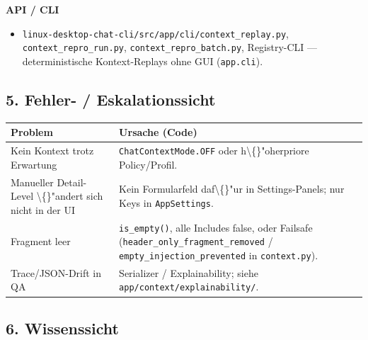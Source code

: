 \textbf{API / CLI}

\begin{itemize}
\item \texttt{linux-desktop-chat-cli/src/app/cli/context\_replay.py}, \texttt{context\_repro\_run.py}, \texttt{context\_repro\_batch.py}, Registry-CLI --- deterministische Kontext-Replays ohne GUI (\texttt{app.cli}).
\end{itemize}

\subsection{5. Fehler- / Eskalationssicht}

\begin{center}
\begin{tabular}{ll}
\hline
Problem & Ursache (Code) \\
\hline
Kein Kontext trotz Erwartung & \texttt{ChatContextMode.OFF} oder h\textbackslash\{\}"oherpriore Policy/Profil. \\
Manueller Detail-Level \textbackslash\{\}"andert sich nicht in der UI & Kein Formularfeld daf\textbackslash\{\}"ur in Settings-Panels; nur Keys in \texttt{AppSettings}. \\
Fragment leer & \texttt{is\_empty()}, alle Includes false, oder Failsafe (\texttt{header\_only\_fragment\_removed} / \texttt{empty\_injection\_prevented} in \texttt{context.py}). \\
Trace/JSON-Drift in QA & Serializer / Explainability; siehe \texttt{app/context/explainability/}. \\
\hline
\end{tabular}
\end{center}

\subsection{6. Wissenssicht}

